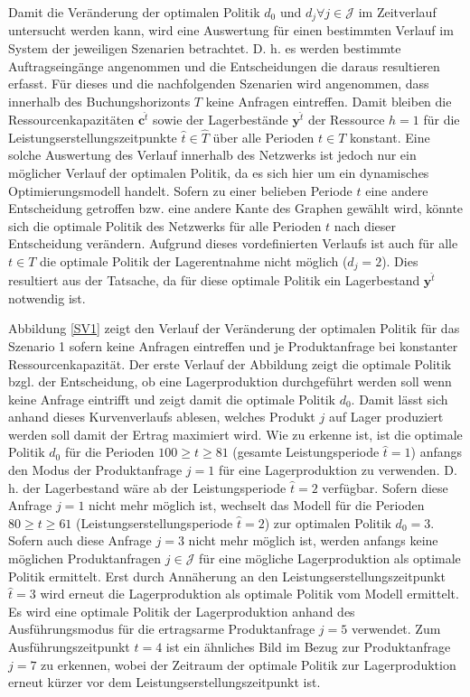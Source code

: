 Damit die Veränderung der optimalen Politik $d_0$ und $d_j \forall j \in \mathcal{J}$ im Zeitverlauf untersucht werden kann, wird eine Auswertung für einen bestimmten Verlauf im System der jeweiligen Szenarien betrachtet. D. h. es werden bestimmte Auftragseingänge angenommen und die Entscheidungen die daraus resultieren erfasst. Für dieses und die nachfolgenden Szenarien wird angenommen, dass innerhalb des Buchungshorizonts $T$ keine Anfragen eintreffen. Damit bleiben die Ressourcenkapazitäten $\textbf{c}^{\hat t}$ sowie der Lagerbestände $\textbf{y}^{\hat t}$ der Ressource $h=1$ für die Leistungserstellungszeitpunkte $\hat t \in \hat T$ über alle Perioden $t\in T$ konstant. Eine solche Auswertung des Verlauf innerhalb des Netzwerks ist jedoch nur ein möglicher Verlauf der optimalen Politik, da es sich hier um ein dynamisches Optimierungsmodell handelt. Sofern zu einer belieben Periode $t$ eine andere Entscheidung getroffen bzw. eine andere Kante des Graphen gewählt wird, könnte sich die optimale Politik des Netzwerks für alle Perioden $t$ nach dieser Entscheidung verändern. Aufgrund dieses vordefinierten Verlaufs ist auch für alle $t \in T$ die optimale Politik der Lagerentnahme nicht möglich ($d_j=2$). Dies resultiert aus der Tatsache, da für diese optimale Politik ein Lagerbestand $\textbf{y}^{\hat t}$ notwendig ist.

Abbildung \ref{SV1} zeigt den Verlauf der Veränderung der optimalen Politik für das Szenario 1 sofern keine Anfragen eintreffen und je Produktanfrage bei konstanter Ressourcenkapazität. Der erste Verlauf der Abbildung zeigt die optimale Politik bzgl. der Entscheidung, ob eine Lagerproduktion durchgeführt werden soll wenn keine Anfrage eintrifft und zeigt damit die optimale Politik $d_0$. Damit lässt sich anhand dieses Kurvenverlaufs ablesen, welches Produkt $j$ auf Lager produziert werden soll damit der Ertrag maximiert wird. Wie zu erkenne ist, ist die optimale Politik $d_0$ für die Perioden $100\ge t \ge 81$ (gesamte Leistungsperiode $\hat t = 1$) anfangs den Modus der Produktanfrage $j=1$ für eine Lagerproduktion zu verwenden. D. h. der Lagerbestand wäre ab der Leistungsperiode $\hat t=2$ verfügbar. Sofern diese Anfrage $j=1$ nicht mehr möglich ist, wechselt das Modell für die Perioden $80\ge t \ge 61$ (Leistungserstellungsperiode $\hat t=2$) zur optimalen Politik $d_0=3$. Sofern auch diese Anfrage $j=3$ nicht mehr möglich ist, werden anfangs keine möglichen Produktanfragen $j\in\mathcal{J}$ für eine mögliche Lagerproduktion als optimale Politik ermittelt. Erst durch Annäherung an den Leistungserstellungszeitpunkt $\hat t = 3$ wird erneut die Lagerproduktion als optimale Politik vom Modell ermittelt. Es wird eine optimale Politik der Lagerproduktion anhand des Ausführungsmodus für die ertragsarme Produktanfrage $j=5$ verwendet. Zum Ausführungszeitpunkt $\hat t = 4$ ist ein ähnliches Bild im Bezug zur Produktanfrage $j=7$ zu erkennen, wobei der Zeitraum der optimale Politik zur Lagerproduktion  erneut kürzer vor dem Leistungserstellungszeitpunkt ist.

